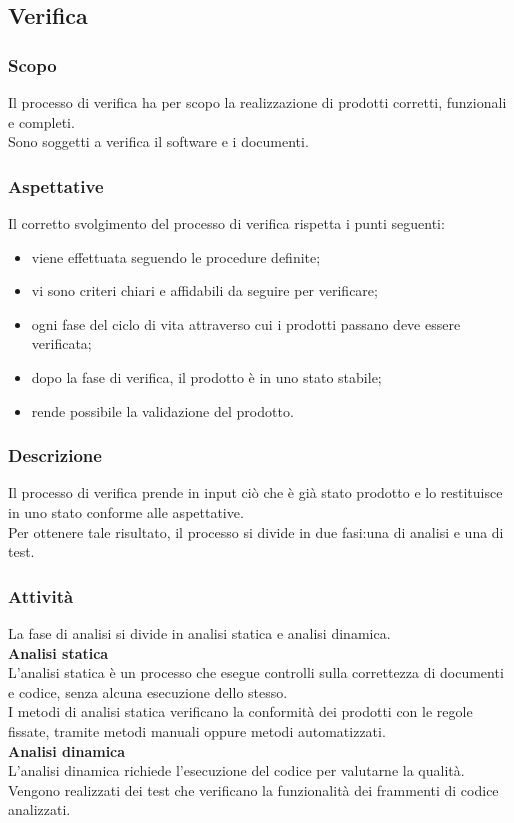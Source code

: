\subsection{Verifica} 
    \label{verifica}
    \subsubsection{Scopo}
    Il processo di verifica ha per scopo la realizzazione di prodotti corretti, funzionali e completi.\\Sono soggetti a verifica il software e i documenti.
    \subsubsection{Aspettative}
    Il corretto svolgimento del processo di verifica rispetta i punti seguenti:
    \begin{itemize}
    	\item viene effettuata seguendo le procedure definite;
    	\item vi sono criteri chiari e affidabili da seguire per verificare;
    	\item ogni fase del ciclo di vita attraverso cui i prodotti passano deve essere verificata;
    	\item dopo la fase di  verifica, il prodotto è in uno stato stabile;
    	\item rende possibile la validazione del prodotto.
    \end{itemize}
    \subsubsection{Descrizione}
    Il processo di verifica prende in input ciò che è già stato prodotto e lo restituisce in uno stato conforme alle aspettative.\\Per ottenere tale risultato, il processo si divide in due fasi:una di analisi e una di test.
    \subsubsection{Attività}
    La fase di analisi si divide in analisi statica e analisi dinamica.\\
    \textbf{Analisi statica}\\
    L'analisi statica è un processo che esegue controlli sulla correttezza di documenti e codice, senza alcuna esecuzione dello stesso.\\I metodi di analisi statica verificano la conformità dei prodotti con le regole fissate, tramite metodi manuali oppure metodi automatizzati.\\ 
    \textbf{Analisi dinamica}\\
    L'analisi dinamica richiede l'esecuzione del codice per valutarne la qualità.\\Vengono realizzati dei test  che verificano la funzionalità dei frammenti di codice analizzati.
    
